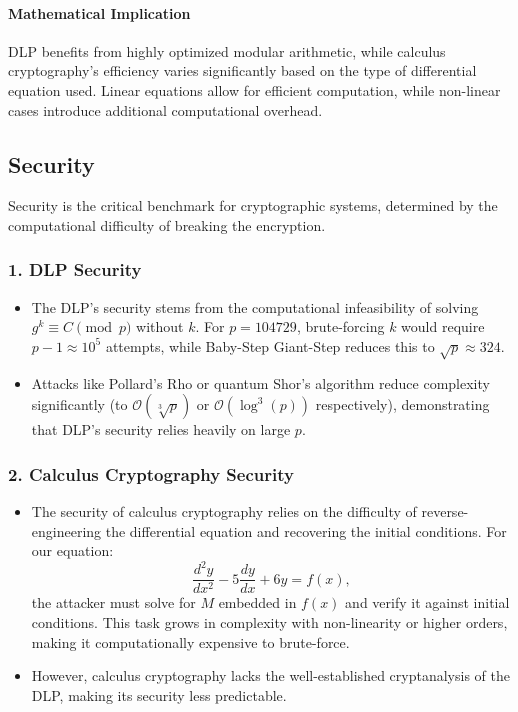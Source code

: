 \documentclass[12pt]{article}
\begin{document}
\paragraph*{Mathematical Implication}
DLP benefits from highly optimized modular arithmetic, while calculus cryptography’s efficiency varies significantly based on the type of differential equation used. Linear equations allow for efficient computation, while non-linear cases introduce additional computational overhead.

\subsection*{Security}

Security is the critical benchmark for cryptographic systems, determined by the computational difficulty of breaking the encryption.

\subsubsection*{1. DLP Security}
\begin{itemize}
    \item The DLP's security stems from the computational infeasibility of solving \( g^k \equiv C \pmod{p} \) without \( k \). For \( p = 104729 \), brute-forcing \( k \) would require \( p - 1 \approx 10^5 \) attempts, while Baby-Step Giant-Step reduces this to \( \sqrt{p} \approx 324 \).
    \item Attacks like Pollard’s Rho or quantum Shor’s algorithm reduce complexity significantly (to \( \mathcal{O}(\sqrt[3]{p}) \) or \( \mathcal{O}(\log^3(p)) \) respectively), demonstrating that DLP’s security relies heavily on large \( p \).
\end{itemize}

\subsubsection*{2. Calculus Cryptography Security}
\begin{itemize}
    \item The security of calculus cryptography relies on the difficulty of reverse-engineering the differential equation and recovering the initial conditions. For our equation:
    \[
    \frac{d^2y}{dx^2} - 5\frac{dy}{dx} + 6y = f(x),
    \]
    the attacker must solve for \( M \) embedded in \( f(x) \) and verify it against initial conditions. This task grows in complexity with non-linearity or higher orders, making it computationally expensive to brute-force.
    \item However, calculus cryptography lacks the well-established cryptanalysis of the DLP, making its security less predictable.
\end{itemize}
\end{document}
